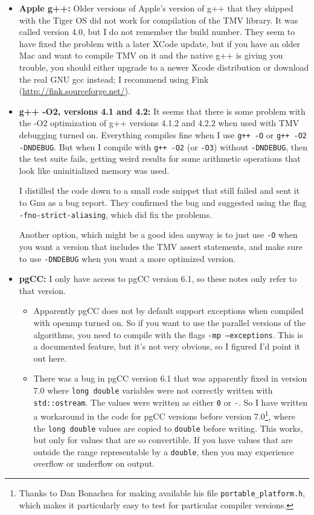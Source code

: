 \documentclass[twoside,letterpaper,11pt]{article}
\renewcommand{\tt}[1]{{\lstinline {#1}}}
\begin{document}
\begin{itemize}
\item {\bf Apple g++:}
Older versions of Apple's version of g++ that they shipped with the Tiger OS did not work for 
compilation of the TMV library.  It was called version 4.0, but I do not remember the build number.
They seem to have fixed the problem with a later XCode update,
but if you have an older Mac and want to compile TMV on it and the native g++ 
is giving you trouble,
you should either upgrade to a newer Xcode distribution or download the real GNU gcc instead;  
I recommend using Fink (\url{http://fink.sourceforge.net/}).

\item {\bf g++ -O2, versions 4.1 and 4.2:}
It seems that there is some problem with the -O2 optimization of g++ versions 4.1.2 and 4.2.2
when used with TMV debugging turned on.  Everything compiles fine when I use
\texttt{g++ -O} or \texttt{g++ -O2 -DNDEBUG}.  But when I compile with \texttt{g++ -O2} (or \texttt{-O3}) without
\texttt{-DNDEBUG}, then the test suite fails, getting weird results for some arithmetic operations
that look like uninitialized memory was used.  

I distilled the code down to a small code snippet that still failed 
and sent it to Gnu as a bug report.
They confirmed the bug and suggested
using the flag \texttt{-fno-strict-aliasing}, which did fix the problems.

Another option, which might be a good idea anyway is to just use \texttt{-O} 
when you want a version that 
includes the TMV assert statements, and make sure to use \texttt{-DNDEBUG} 
when you want a more optimized version.

\item {\bf pgCC:}
I only have access to pgCC version 6.1, so these notes only refer to that version.
\begin{itemize}
\item
Apparently pgCC does not by default support exceptions when compiled 
with openmp turned on.  
So if you want to use the parallel versions of the algorithms,
you need to compile with the flags \texttt{-mp --exceptions}.  This is a documented feature,
but it's not very obvious, so I figured I'd point it out here.

\item 
There was a bug in pgCC version 6.1 that was apparently fixed in version 7.0 where
\tt{long double} variables were not correctly written with \tt{std::ostream}.  The values
were written as either \tt{0} or \tt{-}.  So I have written a workaround in the code for
pgCC versions before version 7.0\footnote{
Thanks to Dan Bonachea for making available his file \texttt{portable\_platform.h},
which makes it particularly easy to test for particular compiler versions.},
where the \tt{long double} values are copied to 
\tt{double} before writing.  This works, but only for values that are so convertible.
If you have values that are outside the range representable by a \tt{double}, then 
you may experience overflow or underflow on output.


\end{itemize}
\end{itemize}
\end{document}
